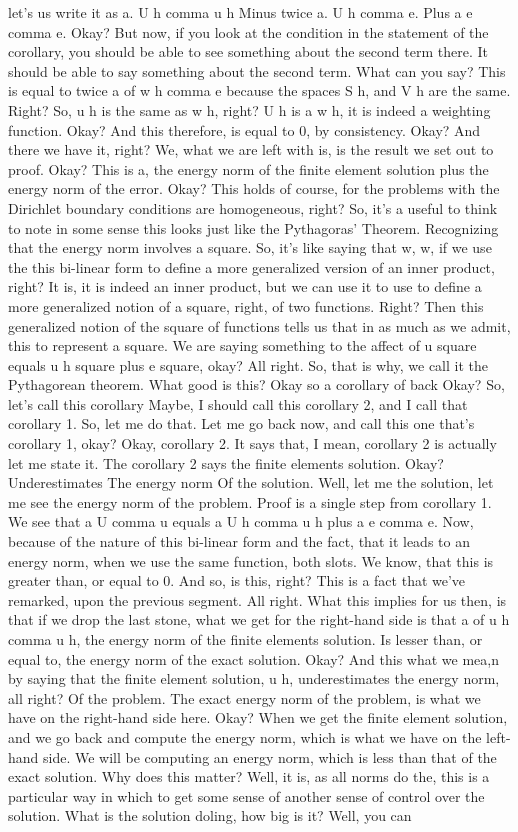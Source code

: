 \documentclass[10pt]{article}
\begin{document}
{let's us write it as a. U h comma u h Minus twice a. U h comma e. Plus a e comma e. Okay? But now, if you look at the condition in the statement of the corollary, you should be able to see something about the second term there. It should be able to say something about the second term. What can you say? This is equal to twice a of w h comma e because the spaces S h, and V h are the same. Right? So, u h is the same as w h, right? U h is a w h, it is indeed a weighting function. Okay? And this therefore, is equal to 0, by consistency. Okay? And there we have it, right? We, what we are left with is, is the result we set out to proof. Okay? This is a, the energy norm of the finite element solution plus the energy norm of the error. Okay? This holds of course, for the problems with the Dirichlet boundary conditions are homogeneous, right? So, it's a useful to think to note in some sense this looks just like the Pythagoras' Theorem. Recognizing that the energy norm involves a square. So, it's like saying that w, w, if we use the this bi-linear form to define a more generalized version of an inner product, right? It is, it is indeed an inner product, but we can use it to use to define a more generalized notion of a square, right, of two functions. Right? Then this generalized notion of the square of functions tells us that in as much as we admit, this to represent a square. We are saying something to the affect of u square equals u h square plus e square, okay? All right. So, that is why, we call it the Pythagorean theorem. What good is this? Okay so a corollary of back Okay? So, let's call this corollary Maybe, I should call this corollary 2, and I call that corollary 1. So, let me do that. Let me go back now, and call this one that's corollary 1, okay? Okay, corollary 2. It says that, I mean, corollary 2 is actually let me state it. The corollary 2 says the finite elements solution. Okay? Underestimates The energy norm Of the solution. Well, let me  the solution, let me see the energy norm of the problem. Proof is a single step from corollary 1. We see that a U comma u equals a U h comma u h plus a e comma e. Now, because of the nature of this bi-linear form and the fact, that it leads to an energy norm, when we use the same function, both slots. We know, that this is greater than, or equal to 0. And so, is this, right? This is a fact that we've remarked, upon the previous segment. All right. What this implies for us then, is that if we drop the last stone, what we get for the right-hand side is that a of u h comma u h, the energy norm of the finite elements solution. Is lesser than, or equal to, the energy norm of the exact solution. Okay? And this what we mea,n by saying that the finite element solution, u h, underestimates the energy norm, all right? Of the problem. The exact energy norm of the problem, is what we have on the right-hand side here. Okay? When we get the finite element solution, and we go back and compute the energy norm, which is what we have on the left-hand side. We will be computing an energy norm, which is less than that of the exact solution. Why does this matter? Well, it is, as all norms do the, this is a particular way in which to get some sense of another sense of control over the solution. What is the solution doling, how big is it? Well, you can }
\end{document}
